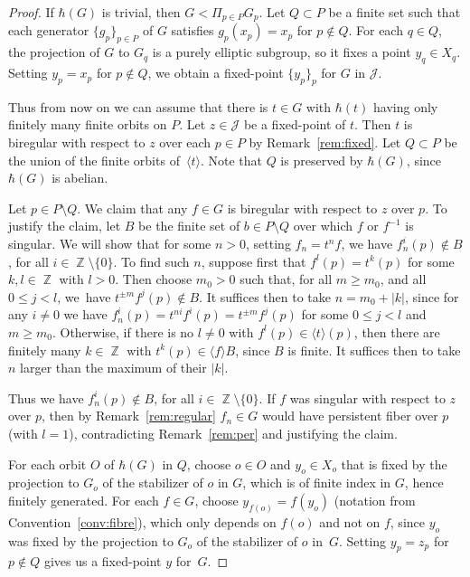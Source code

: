 \documentclass[JEP,XML,SOM,Unicode, NoEqCountersInSection,published]{cedram}
\newcommand{\Z}{\operatorname{\mathbb{Z}}}
\newcommand{\Jon}{\mathscr{J}}
\theoremstyle{plain}
\theoremstyle{definition}
\begin{document}
\begin{proof} If $\hbar(G)$ is trivial, then $G<\Pi_{p\in P} G_p$. Let $Q\subset P$ be a finite set such that each generator $\{g_p\}_{p\in P}$ of $G$ satisfies $g_p(x_p)=x_p$ for $p\notin Q$. For each $q\in Q$, the projection of $G$ to $G_q$ is a purely elliptic subgroup, so it fixes a point $y_q\in X_q$. Setting $y_p=x_p$ for $p\notin Q$, we obtain a fixed-point $\{y_p\}_p$ for $G$ in $\Jon$.

Thus from now on we can assume that there is $t\in G$ with $\hbar(t)$ having only finitely many finite orbits on $P$. Let $z\in \Jon$ be a fixed-point of $t$. Then $t$ is biregular with respect to $z$ over each $p\in P$ {by Remark~\ref{rem:fixed}}.
Let $Q\subset P$ be the union of the finite orbits of~$\langle t\rangle$. Note that $Q$ is preserved by $\hbar(G)$, since $\hbar(G)$ is abelian.

Let $p\in P\setminus Q$. We claim that any $f\in G$ is biregular with respect to $z$ over $p$.
To justify the claim, let $B$ be the finite set of $b\in P\setminus Q$ over which $f$ or $f^{-1}$ is singular. We will show that for some $n>0$, setting $f_n=t^nf$, we have $f_n^i(p)\notin B$, for all $i \in \Z\setminus \{0\}$.
To find such $n$, suppose first that $f^l(p)=t^k(p)$ for some $k,l\in \Z$ with $l> 0$. Then choose $m_0>0$ such that, for all $m\geq m_0$, and all $0\leq j<l$, we~have $t^{\pm m}f^j(p)\notin B$. It suffices then to take $n=m_0+|k|$,
since for any $i\neq 0$ we have $f_n^i(p)=t^{ni}f^i(p)=t^{\pm m}f^j(p)$ for some $0\leq j<l$ and $m\geq m_0$. Otherwise, if there is no $l\neq 0$ with $f^l(p)\in \langle t \rangle(p)$, then
there are finitely many $k\in \Z$ with $t^k(p)\in \langle f\rangle B$, since $B$ is finite. It suffices then to take $n$ larger than the maximum of their $|k|$.

Thus we have $f_n^i(p)\notin B$, for all $i \in \Z\setminus \{0\}$. If $f$ was singular with respect to $z$ over $p$, then by Remark~\ref{rem:regular} $f_n\in G$ would have persistent fiber over $p$ (with $l=1$), contradicting Remark~\ref{rem:per} and justifying the claim.

For each orbit $O$ of $\hbar(G)$ in $Q$, choose $o\in O$ and $y_o\in X_o$ that is fixed by the projection to $G_o$ of the stabilizer of $o$ in $G$, which is of finite index in $G$, hence finitely generated. For each $f\in G$, choose $y_{f(o)}=f(y_o)$ (notation from Convention~\ref{conv:fibre}),
which only depends on $f(o)$ and not on $f$, since $y_o$ was fixed by the projection to $G_o$ of the stabilizer of $o$ in~$G$.
Setting $y_p=z_p$ for $p\notin Q$ gives us a fixed-point $y$ for~$G$.
\end{proof}
\end{document}
